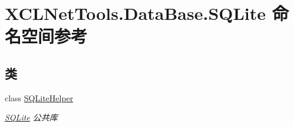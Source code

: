 \hypertarget{namespace_x_c_l_net_tools_1_1_data_base_1_1_s_q_lite}{}\section{X\+C\+L\+Net\+Tools.\+Data\+Base.\+S\+Q\+Lite 命名空间参考}
\label{namespace_x_c_l_net_tools_1_1_data_base_1_1_s_q_lite}
\subsection*{类}
\begin{DoxyCompactItemize}
\item 
class \hyperlink{class_x_c_l_net_tools_1_1_data_base_1_1_s_q_lite_1_1_s_q_lite_helper}{S\+Q\+Lite\+Helper}
\begin{DoxyCompactList}\small\item\em \hyperlink{namespace_x_c_l_net_tools_1_1_data_base_1_1_s_q_lite}{S\+Q\+Lite} 公共库 \end{DoxyCompactList}\end{DoxyCompactItemize}

